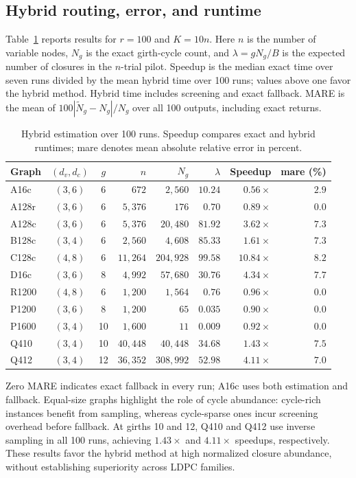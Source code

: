 \documentclass[conference]{IEEEtran}
\begin{document}
\subsection{Hybrid routing, error, and runtime}
Table~\ref{tab:hybrid-exp} reports results for
$r=100$ and $K=10n$.
Here $n$ is the number of variable nodes, $N_g$ is the exact
girth-cycle count, and $\lambda=gN_g/B$ is the expected number
of closures in the $n$-trial pilot.
Speedup is the median exact time over seven runs divided
by the mean hybrid time over 100 runs; values above one
favor the hybrid method. Hybrid time includes screening
and exact fallback. MARE is the mean of
$100|\widetilde N_g-N_g|/N_g$ over all 100 outputs,
including exact returns.

\begin{table}[!ht]
\centering
\caption{Hybrid estimation over 100 runs.
Speedup compares exact and hybrid runtimes; mare denotes
mean absolute relative error in percent.}
\label{tab:hybrid-exp}
\footnotesize
\setlength{\tabcolsep}{3.6pt}
\begin{tabular}{lccrrrrr}
\hline
Graph & $(d_v,d_c)$ & $g$ & $n$ & $N_g$ & $\lambda$
& Speedup & mare (\%)\\
\hline
A16c  & $(3,6)$ & 6 & $672$ & $2,560$ & $10.24$ & $0.56\times$ & $2.9$\\
A128r & $(3,6)$ & 6 & $5,376$ & $176$ & $0.70$ & $0.89\times$ & $0.0$\\
A128c & $(3,6)$ & 6 & $5,376$ & $20,480$ & $81.92$ & $3.62\times$ & $7.3$\\
B128c & $(3,4)$ & 6 & $2,560$ & $4,608$ & $85.33$ & $1.61\times$ & $7.3$\\
C128c & $(4,8)$ & 6 & $11,264$ & $204,928$ & $99.58$ & $10.84\times$ & $8.2$\\
D16c  & $(3,6)$ & 8 & $4,992$ & $57,680$ & $30.76$ & $4.34\times$ & $7.7$\\
R1200 & $(4,8)$ & 6 & $1,200$ & $1,564$ & $0.76$ & $0.96\times$ & $0.0$\\
P1200 & $(3,6)$ & 8 & $1,200$ & $65$ & $0.035$ & $0.90\times$ & $0.0$\\
P1600 & $(3,4)$ & 10 & $1,600$ & $11$ & $0.009$ & $0.92\times$ & $0.0$\\
Q410  & $(3,4)$ & 10 & $40,448$ & $40,448$ & $34.68$ & $1.43\times$ & $7.5$\\
Q412  & $(3,4)$ & 12 & $36,352$ & $308,992$ & $52.98$ & $4.11\times$ & $7.0$\\
\hline
\end{tabular}
\end{table}
Zero MARE indicates exact fallback in every run;
A16c uses both estimation and fallback.
Equal-size graphs highlight the role of cycle abundance:
cycle-rich instances benefit from sampling, whereas
cycle-sparse ones incur screening overhead before fallback.
At girths 10 and 12, Q410 and Q412 use inverse sampling
in all 100 runs, achieving $1.43\times$ and $4.11\times$
speedups, respectively. These results favor the hybrid
method at high normalized closure abundance, without
establishing superiority across LDPC families.
\end{document}
